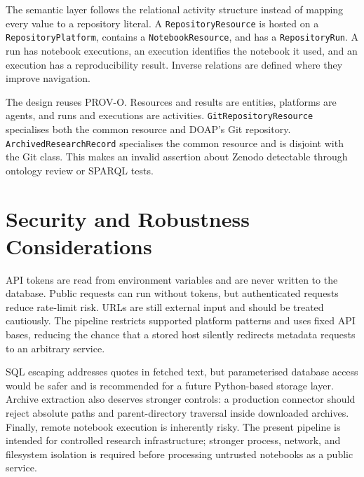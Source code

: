 The semantic layer follows the relational activity structure instead of mapping every value to a repository literal. A \texttt{RepositoryResource} is hosted on a \texttt{RepositoryPlatform}, contains a \texttt{NotebookResource}, and has a \texttt{RepositoryRun}. A run has notebook executions, an execution identifies the notebook it used, and an execution has a reproducibility result. Inverse relations are defined where they improve navigation.

The design reuses PROV-O. Resources and results are entities, platforms are agents, and runs and executions are activities. \texttt{GitRepositoryResource} specialises both the common resource and DOAP's Git repository. \texttt{ArchivedResearchRecord} specialises the common resource and is disjoint with the Git class. This makes an invalid assertion about Zenodo detectable through ontology review or SPARQL tests.

\section{Security and Robustness Considerations}

API tokens are read from environment variables and are never written to the database. Public requests can run without tokens, but authenticated requests reduce rate-limit risk. URLs are still external input and should be treated cautiously. The pipeline restricts supported platform patterns and uses fixed API bases, reducing the chance that a stored host silently redirects metadata requests to an arbitrary service.

SQL escaping addresses quotes in fetched text, but parameterised database access would be safer and is recommended for a future Python-based storage layer. Archive extraction also deserves stronger controls: a production connector should reject absolute paths and parent-directory traversal inside downloaded archives. Finally, remote notebook execution is inherently risky. The present pipeline is intended for controlled research infrastructure; stronger process, network, and filesystem isolation is required before processing untrusted notebooks as a public service.
